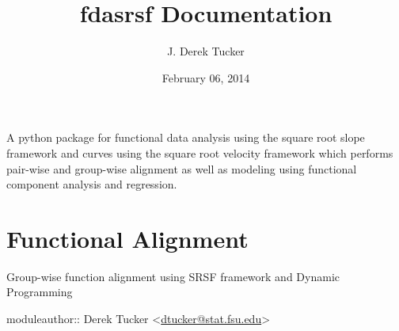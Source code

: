 \documentclass[letterpaper,10pt,english]{sphinxmanual}
\title{fdasrsf Documentation}
\date{February 06, 2014}
\author{J. Derek Tucker}
\begin{document}
\maketitle
\tableofcontents
{}\label{index::doc}


A python package for functional data analysis using the square root
slope framework and curves using the square root velocity framework
which performs pair-wise and group-wise alignment as well as modeling
using functional component analysis and regression.


\chapter{Functional Alignment}
\label{time_warping:functional-alignment}\label{time_warping:module-time_warping}\label{time_warping:welcome-to-fdasrsf-s-documentation}\label{time_warping::doc}
Group-wise function alignment using SRSF framework and Dynamic Programming

moduleauthor:: Derek Tucker \textless{}\href{mailto:dtucker@stat.fsu.edu}{dtucker@stat.fsu.edu}\textgreater{}
\end{document}
